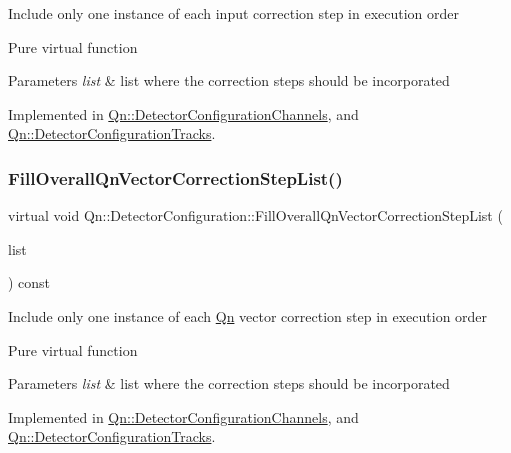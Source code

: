 Include only one instance of each input correction step in execution order

Pure virtual function 
\begin{DoxyParams}{Parameters}
{\em list} & list where the correction steps should be incorporated \\
\hline
\end{DoxyParams}


Implemented in \mbox{\hyperlink{classQn_1_1DetectorConfigurationChannels_aa9e99a908719d0de616cebf9329fe83f}{Qn\+::\+Detector\+Configuration\+Channels}}, and \mbox{\hyperlink{classQn_1_1DetectorConfigurationTracks_a3ef9f093c8d272b48f7371b23eb3d498}{Qn\+::\+Detector\+Configuration\+Tracks}}.

\mbox{\label{classQn_1_1DetectorConfiguration_ad71d83a2b0a5cee45bde15e936843e49}} 
\subsubsection{\texorpdfstring{Fill\+Overall\+Qn\+Vector\+Correction\+Step\+List()}{FillOverallQnVectorCorrectionStepList()}}
{\footnotesize\ttfamily virtual void Qn\+::\+Detector\+Configuration\+::\+Fill\+Overall\+Qn\+Vector\+Correction\+Step\+List (\begin{DoxyParamCaption}\item[{T\+List $\ast$}]{list }\end{DoxyParamCaption}) const\hspace{0.3cm}{\ttfamily [pure virtual]}}

Include only one instance of each \mbox{\hyperlink{namespaceQn}{Qn}} vector correction step in execution order

Pure virtual function 
\begin{DoxyParams}{Parameters}
{\em list} & list where the correction steps should be incorporated \\
\hline
\end{DoxyParams}


Implemented in \mbox{\hyperlink{classQn_1_1DetectorConfigurationChannels_a002931544421b46c9402aa7bdefcff51}{Qn\+::\+Detector\+Configuration\+Channels}}, and \mbox{\hyperlink{classQn_1_1DetectorConfigurationTracks_a4e725e8d949ab829c804b4e5d9323ff6}{Qn\+::\+Detector\+Configuration\+Tracks}}.

